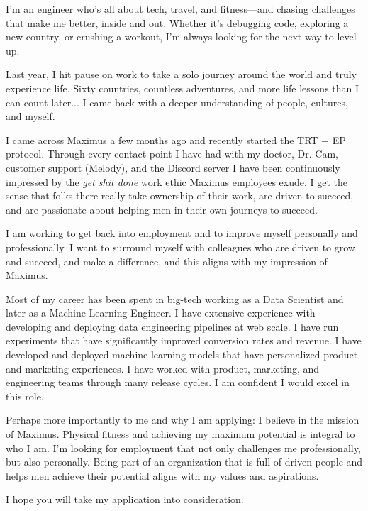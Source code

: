 \makelettertitle

\begin{cvletter}

%
I'm an engineer who's all about tech, travel, and fitness—and chasing challenges that make me better, inside and out. Whether it's debugging code, exploring a new country, or crushing a workout, I'm always looking for the next way to level-up.

Last year, I hit pause on work to take a solo journey around the world and truly experience life. Sixty countries, countless adventures, and more life lessons than I can count later... I came back with a deeper understanding of people, cultures, and myself. 

I came across Maximus a few months ago and recently started the TRT + EP protocol. Through every contact point I have had with my doctor, Dr. Cam, customer support (Melody), and the Discord server I have been continuously impressed by the \textit{get shit done} work ethic Maximus employees exude. I get the sense that folks there really take ownership of their work, are driven to succeed, and are passionate about helping men in their own journeys to succeed.

I am working to get back into employment and to improve myself personally and professionally. I want to surround myself with colleagues who are driven to grow and succeed, and make a difference, and this aligns with my impression of Maximus.

Most of my career has been spent in big-tech working as a Data Scientist and later as a Machine Learning Engineer. I have extensive experience with developing and deploying data engineering pipelines at web scale. I have run experiments that have significantly improved conversion rates and revenue. I have developed and deployed machine learning models that have personalized product and marketing experiences. I have worked with product, marketing, and engineering teams through many release cycles. I am confident I would excel in this role.

Perhaps more importantly to me and why I am applying: I believe in the mission of Maximus. Physical fitness and achieving my maximum potential is integral to who I am. I'm looking for employment that not only challenges me professionally, but also personally. Being part of an organization that is full of driven people and helps men achieve their potential aligns with my values and aspirations.

I hope you will take my application into consideration. 

\end{cvletter}


\makeletterclosing


